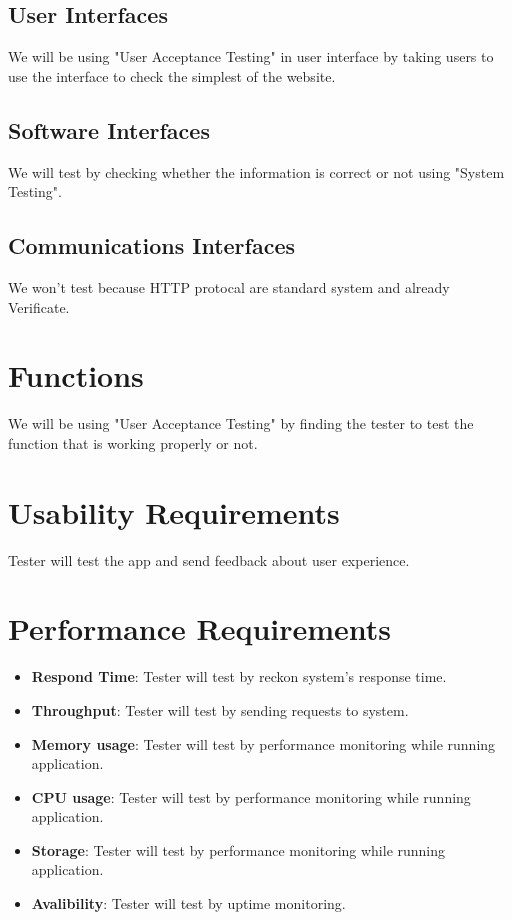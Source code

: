 \documentclass[ 10pt]{report}
\begin{document}
        \subsection{User Interfaces}
            We will be using "User Acceptance Testing" in user interface by taking users to use the interface to check the simplest of the website.
        \subsection{Software Interfaces}
            We will test by checking whether the information is correct or not using "System Testing".
        \subsection{Communications Interfaces}
            We won't test because HTTP protocal are standard system and already Verificate.
        \section{Functions}
        We will be using "User Acceptance Testing" by finding the tester to test the function that is working properly or not.
        \section{Usability Requirements}
        Tester will test the app and send feedback about user experience.
        \section{Performance Requirements}
        \begin{itemize}
            \item \textbf{Respond Time}: Tester will test by reckon system's response time.  
            \item \textbf{Throughput}: Tester will test by sending requests to system.
            \item \textbf{Memory usage}: Tester will test by performance monitoring while running application.
            \item \textbf{CPU usage}: Tester will test by performance monitoring while running application.
            \item \textbf{Storage}: Tester will test by performance monitoring while running application.
            \item \textbf{Avalibility}: Tester will test by uptime monitoring.
            \end{itemize}
\end{document}
